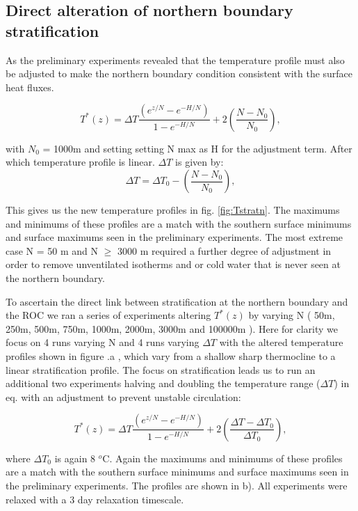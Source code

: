 \subsection{Direct alteration of northern boundary stratification}

As the preliminary experiments revealed that the temperature profile must also be adjusted to make the northern boundary condition consistent with the surface heat fluxes.

\begin{equation}
T^*(z)=\Delta T \frac{(e^{z/N}-e^{-H/N})}{1-e^{-H/N}} + 2\left(  \frac{N-N_0}{N_0}\right),
\label{eq:tprofn}
\end{equation} 

with $ N_0$ = 1000m and setting setting N max as H for the adjustment term. After which temperature profile is linear.
$\Delta T $ is given by:
\begin{equation}
\Delta T = \Delta T _0 - \left( \frac{N-N_0}{N_0}\right),
\end{equation} 


This gives us the new temperature profiles in fig. \ref{fig:Tstratn}. The maximums and minimums of these profiles are a match with the southern surface minimums and surface maximums seen in the preliminary experiments. The most extreme case N = 50 m and N $\geq $ 3000 m required a further degree of adjustment in order to remove unventilated isotherms and or cold water that is never seen at the northern boundary.   

 To ascertain the direct link between stratification at the northern boundary and the ROC we ran a series of experiments altering $T^*(z)$ by varying N ( 50m, 250m, 500m, 750m, 1000m, 2000m, 3000m and 100000m ). Here for clarity we focus on 4 runs varying N and 4 runs varying $\Delta T$ with the altered temperature profiles shown in figure .a , which vary from a shallow sharp thermocline to a linear stratification profile. The focus on stratification leads us to run an additional two experiments halving and doubling the temperature range ($\Delta T$) in eq.  with an adjustment to prevent unstable circulation:

\begin{equation}
T^*(z)=\Delta T \frac{(e^{z/N}-e^{-H/N})}{1-e^{-H/N}} + 2\left(   \frac{\Delta T - \Delta T_0  }{\Delta T _0} \right),
\label{eq:tprofdt}
\end{equation} 

where $\Delta T _0$ is again 8 $^o$C. Again the maximums and minimums of these profiles are a match with the southern surface minimums and surface maximums seen in the preliminary experiments. The profiles are shown in b). All experiments were relaxed with a 3 day relaxation timescale.

